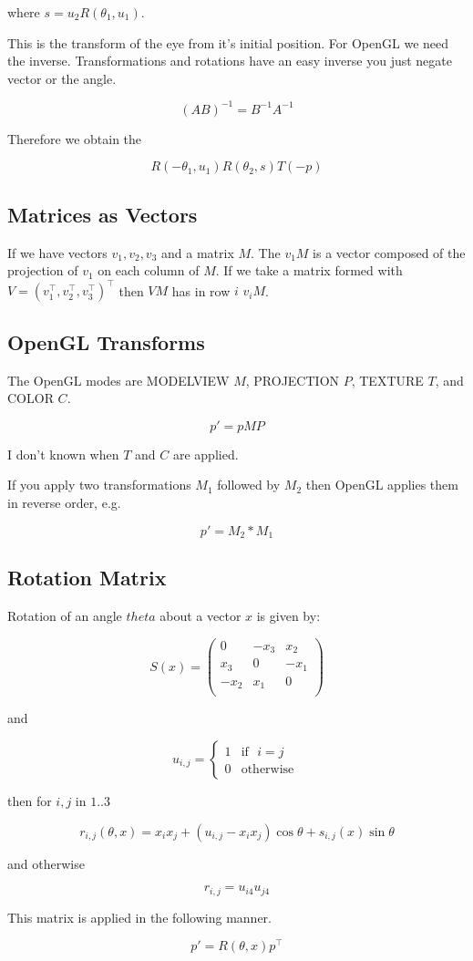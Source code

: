 \documentclass[12pt]{article}
\begin{document}
where $s = u_2 R(\theta_1, u_1)$.

This is the transform of the eye from it's initial position. For
OpenGL we need the inverse. Transformations and rotations have an easy
inverse you just negate vector or the angle.

\[
   (AB)^{-1} = B^{-1} A^{-1}
\]

Therefore we obtain the 

\[
  R(-\theta_1, u_1) R(\theta_2, s) T(-p) 
\]

\subsection{Matrices as Vectors}

If we have vectors $v_1, v_2, v_3$ and a matrix $M$. The $v_1 M$ is a
vector composed of the projection of $v_1$ on each column of $M$. If
we take a matrix formed with $V = (v_1^\top, v_2^\top, v_3^\top)^\top$
then $VM$ has in row $i$ $v_iM$.


\subsection{OpenGL Transforms}

The OpenGL modes are MODELVIEW $M$, PROJECTION $P$, TEXTURE $T$, and
COLOR $C$.

\[
  p' = pMP
\]

I don't known when $T$ and $C$ are applied.

If you apply two transformations $M_1$ followed by $M_2$ then OpenGL
applies them in reverse order, e.g.

\[
  p' = M_2 * M_1
\]

\subsection{Rotation Matrix}

Rotation of an angle $theta$ about a vector $x$ is given by:

\[
  S(x) = \left ( \begin{array}{ccc}
     0    & -x_3 & x_2    \\
     x_3  & 0    & -x_1   \\
     -x_2 & x_1  & 0      \\
  \end{array} \right )
\]

and

\[ u_{i,j} = \left \{ \begin{array}{ll}
     1 & \mbox{if}\:\:\: i = j \\
     0 & \mbox{otherwise}\: 
   \end{array} \right .
\]

then for $i, j$ in $1 .. 3$

\[
  r_{i,j}(\theta, x) =
    x_i x_j + (u_{i,j} - x_ix_j)\cos \theta + s_{i,j}(x) \sin \theta
\]

and otherwise

\[
  r_{i,j} = u_{i4} u_{j4}
\]

This matrix is applied in the following manner.

\[
  p' = R(\theta, x) p^\top
\]
\end{document}
